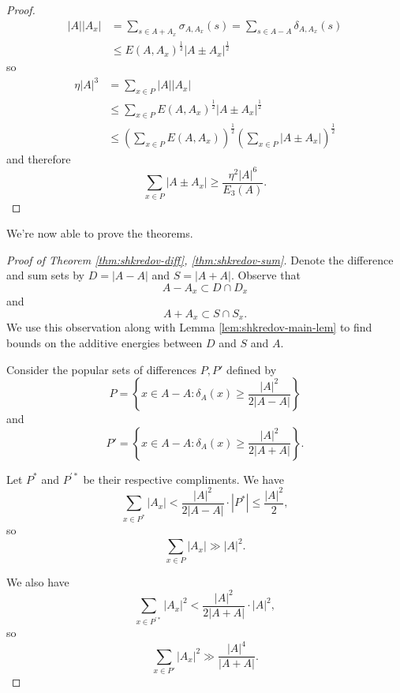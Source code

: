 \documentclass[12pt,reqno]{amsart}
\begin{document}
\begin{proof}
\begin{align*}
\left\lvert A \right\rvert \left\lvert A_{x}  \right\rvert & = \sum _{s \in A + A_{x} } \sigma_{A, A_{x} } (s) = \sum _{s \in A-A} \delta_{A, A_{x} } (s)\\
& \leq E\left( A, A_{x}  \right) ^{\frac{1}{2} } \left\lvert A \pm  A_{x}  \right\rvert ^{\frac{1}{2} }
\end{align*}
so
\begin{align*}
\eta \left\lvert A \right\rvert ^{3} & =  \sum _{x \in P} \left\lvert A \right\rvert \left\lvert A_{x}  \right\rvert \\
& \leq \sum _{x \in P} E(A, A_{x} )^{\frac{1}{2} }\left\lvert A \pm A_{x}  \right\rvert ^{\frac{1}{2} } \\
& \leq \left( \sum _{x\in P} E(A,A_{x} ) \right)  ^{\frac{1}{2} } \left( \sum _{x \in P} \left\lvert A \pm A_{x}  \right\rvert  \right) ^{\frac{1}{2} }
\end{align*}
and therefore
\[
    \sum _{x \in P} \left\lvert A \pm A_{x}  \right\rvert \geq \frac{\eta ^{2}\left\lvert A \right\rvert ^{6}}{E_{3} (A)} 
.\]

\end{proof}

We're now able to prove the theorems.

\begin{proof}[Proof of Theorem \ref{thm:shkredov-diff}, \ref{thm:shkredov-sum}]
Denote the difference and sum sets by \(D = \left\lvert A-A \right\rvert \) and \(S = \left\lvert A+A \right\rvert \).
Observe that
\[
    A - A_{x} \subset D \cap D_{x} 
\]
and
\[
    A + A_{x} \subset S \cap S_{x} 
.\]
We use this observation along with Lemma \ref{lem:shkredov-main-lem} to find bounds on
the additive energies between \(D\) and \(S\) and \(A\).

Consider the popular sets of differences \(P,P'\) defined by
\[
    P = \left\{ x \in A - A : \delta_{A} (x) \geq \frac{\left\lvert A \right\rvert ^{2}}{2 \left\lvert A-A \right\rvert }  \right\} 
\]
and
\[
    P ' = \left\{ x \in A-A : \delta_{A} (x) \geq \frac{\left\lvert A \right\rvert ^{2}}{2\left\lvert A + A \right\rvert }  \right\} 
.\]

Let \(P^{*}\) and \(P^{'*}\) be their respective compliments. We have
\[
    \sum _{x \in P^{*}} \left\lvert A_{x} \right\rvert < \frac{\left\lvert A \right\rvert ^{2}}{2 \left\lvert A-A \right\rvert } \cdot  \left\lvert P^{*} \right\rvert \leq \frac{\left\lvert A \right\rvert ^{2}}{2} 
,\]
so
\begin{equation} \label{eq:shkredov-1}
    \sum _{x \in P} \left\lvert A_{x}  \right\rvert \gg \left\lvert A \right\rvert ^{2}
    .
\end{equation}

We also have
\[
    \sum _{x \in P ^{'*}} \left\lvert A_{x}  \right\rvert ^{2} < \frac{\left\lvert A \right\rvert ^{2}}{2 \left\lvert A+A \right\rvert } \cdot \left\lvert A \right\rvert ^{2}
,\]
so
\[
    \sum _{x \in P'} \left\lvert A_{x}  \right\rvert ^{2} \gg \frac{\left\lvert A \right\rvert ^{4}}{\left\lvert A+A \right\rvert } 
.\]
\end{proof}
\end{document}
